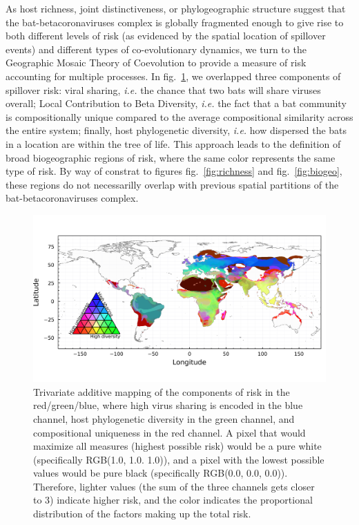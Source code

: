 \documentclass[10pt,oneside]{article}
\makeatletter
\def\maxwidth{\ifdim\Gin@nat@width>\linewidth\linewidth
\else\Gin@nat@width\fi}
\let\Oldincludegraphics\includegraphics
\renewcommand{\includegraphics}[1]{\Oldincludegraphics[width=\maxwidth]{#1}}
\makeatother
\begin{document}
As host richness, joint distinctiveness, or phylogeographic structure
suggest that the bat-betacoronaviruses complex is globally fragmented
enough to give rise to both different levels of risk (as evidenced by
the spatial location of spillover events) and different types of
co-evolutionary dynamics, we turn to the Geographic Mosaic Theory of
Coevolution to provide a measure of risk accounting for multiple
processes. In fig.~\ref{fig:trivariate}, we overlapped three components
of spillover risk: viral sharing, \emph{i.e.} the chance that two bats
will share viruses overall; Local Contribution to Beta Diversity,
\emph{i.e.} the fact that a bat community is compositionally unique
compared to the average compositional similarity across the entire
system; finally, host phylogenetic diversity, \emph{i.e.} how dispersed
the bats in a location are within the tree of life. This approach leads
to the definition of broad biogeographic regions of risk, where the same
color represents the same type of risk. By way of constrat to figures
fig.~\ref{fig:richness} and fig.~\ref{fig:biogeo}, these regions do not
necessarilly overlap with previous spatial partitions of the
bat-betacoronaviruses complex.

\begin{figure}
\hypertarget{fig:trivariate}{%
\centering
\includegraphics{figures/risk_trivariate.png}
\caption{Trivariate additive mapping of the components of risk in the
red/green/blue, where high virus sharing is encoded in the blue channel,
host phylogenetic diversity in the green channel, and compositional
uniqueness in the red channel. A pixel that would maximize all measures
(highest possible risk) would be a pure white (specifically RGB(1.0,
1.0. 1.0)), and a pixel with the lowest possible values would be pure
black (specifically RGB(0.0, 0.0, 0.0)). Therefore, lighter values (the
sum of the three channels gets closer to 3) indicate higher risk, and
the color indicates the proportional distribution of the factors making
up the total risk.}\label{fig:trivariate}
}
\end{figure}
\end{document}
